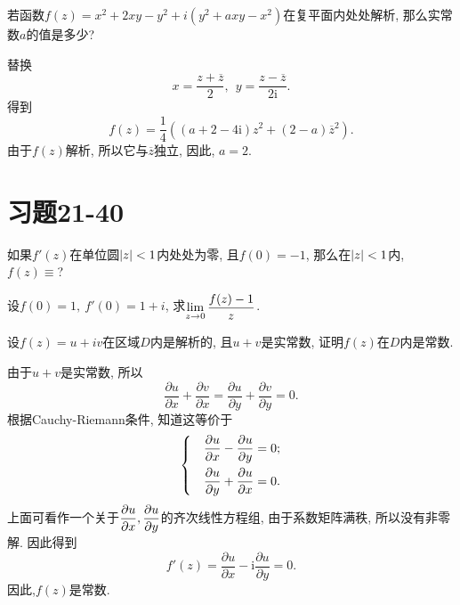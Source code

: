 \begin{yyEx}
	若函数$f(z) = x^2+2xy-y^2 + i(y^2 + axy -x^2)$在复平面内处处解析, 那么实常数$a$的值是多少?
\end{yyEx}

\begin{yySolution}
    替换\begin{equation*}
        x = \frac{z + \overline{z}}{2},~~y = \frac{z-\overline{z}}{2\mathrm{i}}.
    \end{equation*}
    得到\begin{equation*}
        f(z) = \frac{1}{4} \left((a+2-4\mathrm{i}) z^2+(2-a) \overline{z}^2\right).
    \end{equation*}
    由于$f(z)$解析, 所以它与$\overline{z}$独立, 因此, $a = 2$.
\end{yySolution}

\section{习题21-40}

\begin{yyEx}
	如果$f'(z)$在单位圆$\lvert z\rvert<1$内处处为零, 且$f(0) = -1$, 那么在$\lvert z\rvert<1$内, $f(z)\equiv$?
\end{yyEx}

\begin{yyEx}
	设$f(0) = 1,~f'(0) = 1+i$, 求$\begin{lgathered}\lim\limits_{z\to 0}\frac{f(z) - 1}{z}\end{lgathered}$.
\end{yyEx}

\begin{yyEx}
	设$f(z) = u + iv$在区域$D$内是解析的, 且$u+v$是实常数, 证明$f(z)$在$D$内是常数.
\end{yyEx}

\begin{yyProof}
    由于$u+v$是实常数, 所以\begin{equation*}
        \frac{\partial u}{\partial x} + \frac{\partial v}{\partial x} = \frac{\partial u}{\partial y} + \frac{\partial v}{\partial y} = 0.
    \end{equation*}
    根据Cauchy-Riemann条件, 知道这等价于\begin{equation*}
        \begin{dcases}
            &\frac{\partial u}{\partial x} - \frac{\partial u}{\partial y} = 0;\\
            &\frac{\partial u}{\partial y} + \frac{\partial u}{\partial x} = 0.
        \end{dcases}
    \end{equation*}
    上面可看作一个关于$\begin{lgathered}\frac{\partial u}{\partial x},\frac{\partial u}{\partial y}\end{lgathered}$的齐次线性方程组, 由于系数矩阵满秩, 所以没有非零解.
    因此得到\begin{equation*}
        f'(z) = \frac{\partial u}{\partial x} - \mathrm{i}\frac{\partial u}{\partial y} = 0.
    \end{equation*}
    因此,$f(z)$是常数.
\end{yyProof}

